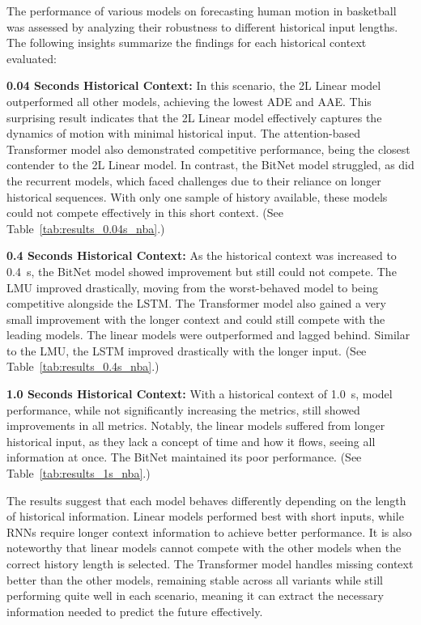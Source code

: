 The performance of various models on forecasting human motion in basketball was assessed by analyzing their robustness to different historical input lengths. The following insights summarize the findings for each historical context evaluated:

\textbf{0.04 Seconds Historical Context:} In this scenario, the 2L Linear model outperformed all other models, achieving the lowest ADE and AAE. This surprising result indicates that the 2L Linear model effectively captures the dynamics of motion with minimal historical input. The attention-based Transformer model also demonstrated competitive performance, being the closest contender to the 2L Linear model. In contrast, the BitNet model struggled, as did the recurrent models, which faced challenges due to their reliance on longer historical sequences. With only one sample of history available, these models could not compete effectively in this short context. (See Table~\ref{tab:results_0.04s_nba}.)

\textbf{0.4 Seconds Historical Context:} As the historical context was increased to \SI{0.4}{\second}, the BitNet model showed improvement but still could not compete. The LMU improved drastically, moving from the worst-behaved model to being competitive alongside the LSTM. The Transformer model also gained a very small improvement with the longer context and could still compete with the leading models. The linear models were outperformed and lagged behind. Similar to the LMU, the LSTM improved drastically with the longer input. (See Table~\ref{tab:results_0.4s_nba}.)

\textbf{1.0 Seconds Historical Context:} With a historical context of \SI{1.0}{\second}, model performance, while not significantly increasing the metrics, still showed improvements in all metrics. Notably, the linear models suffered from longer historical input, as they lack a concept of time and how it flows, seeing all information at once. The BitNet maintained its poor performance. (See Table~\ref{tab:results_1s_nba}.)

The results suggest that each model behaves differently depending on the length of historical information. Linear models performed best with short inputs, while RNNs require longer context information to achieve better performance. It is also noteworthy that linear models cannot compete with the other models when the correct history length is selected. The Transformer model handles missing context better than the other models, remaining stable across all variants while still performing quite well in each scenario, meaning it can extract the necessary information needed to predict the future effectively.


